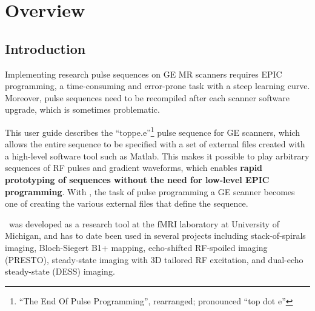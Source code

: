 

\chapter{Overview}
\setcounter{page}{1}

\section{Introduction}
Implementing research pulse sequences on GE MR scanners requires EPIC programming, a time-consuming and error-prone task with a steep learning curve.
Moreover, pulse sequences need to be recompiled after each scanner software upgrade, which is sometimes problematic.

This user guide describes the ``toppe.e''\footnote{``The End Of Pulse Programming'', rearranged; pronounced ``top dot e''} pulse sequence for GE scanners, which allows the entire sequence to be specified with a set of external files created with a high-level software tool such as Matlab.
This makes it possible to play arbitrary sequences of RF pulses and gradient waveforms, which enables \textbf{rapid prototyping of sequences without the need for low-level EPIC programming}.
With \toppe, the task of pulse programming a GE scanner becomes one of creating the various external files that define the sequence.


\toppe~was developed as a research tool at the fMRI laboratory at University of Michigan, and has to date been used in several projects including stack-of-spirals imaging, Bloch-Siegert B1+ mapping, echo-shifted RF-spoiled imaging (PRESTO), steady-state imaging with 3D tailored RF excitation, and dual-echo steady-state (DESS) imaging.

